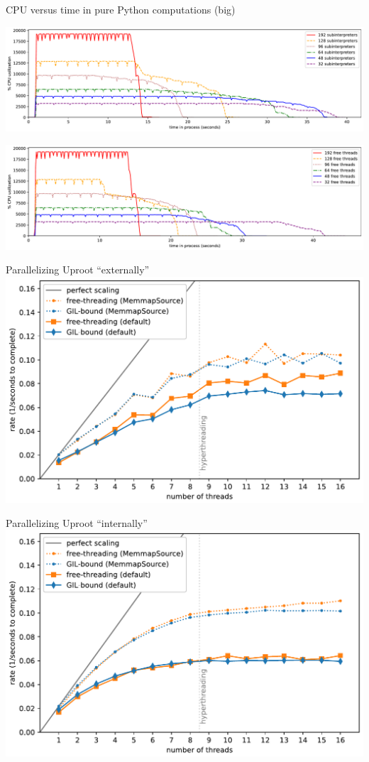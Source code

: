 \documentclass[aspectratio=169]{beamer}
\begin{document}
\begin{frame}{CPU versus time in pure Python computations (big)}
\vspace{0.25 cm}
\begin{center}
\includegraphics[width=0.93\linewidth]{img/cpu-of-compute-subinterpreters-big.pdf}

\includegraphics[width=0.93\linewidth]{img/cpu-of-compute-free-threads-big.pdf}
\end{center}
\end{frame}

\begin{frame}{Parallelizing Uproot ``externally''}
\vspace{0.5 cm}
\includegraphics[width=0.8\linewidth]{img/scaling-of-uproot-external.pdf}
\end{frame}

\begin{frame}{Parallelizing Uproot ``internally''}
\vspace{0.5 cm}
\includegraphics[width=0.8\linewidth]{img/scaling-of-uproot-internal.pdf}
\end{frame}
\end{document}
